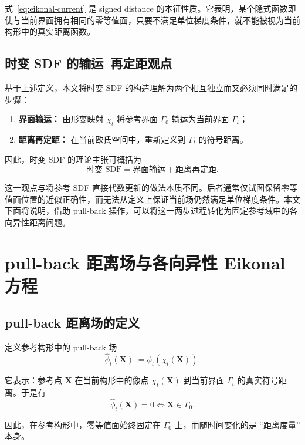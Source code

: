 \documentclass[12pt,a4paper]{ctexart}
\numberwithin{equation}{section}
\newcommand{\bX}{\bm{X}}
\begin{document}
式~\eqref{eq:eikonal-current} 是 signed distance 的本征性质。它表明，某个隐式函数即使与当前界面拥有相同的零等值面，只要不满足单位梯度条件，就不能被视为当前构形中的真实距离函数。

\subsection{时变 SDF 的输运--再定距观点}

基于上述定义，本文将时变 SDF 的构造理解为两个相互独立而又必须同时满足的步骤：
\begin{enumerate}[label=\arabic*)]
    \item \textbf{界面输运：} 由形变映射 $\chi_t$ 将参考界面 $\Gamma_0$ 输运为当前界面 $\Gamma_t$；
    \item \textbf{距离再定距：} 在当前欧氏空间中，重新定义到 $\Gamma_t$ 的符号距离。
\end{enumerate}

因此，时变 SDF 的理论主张可概括为
\begin{equation}
\boxed{
\text{时变 SDF} = \text{界面输运} + \text{距离再定距}.
}
\end{equation}

这一观点与将参考 SDF 直接代数更新的做法本质不同。后者通常仅试图保留零等值面位置的近似正确性，而无法从定义上保证当前场仍然满足单位梯度条件。本文下面将说明，借助 pull-back 操作，可以将这一两步过程转化为固定参考域中的各向异性距离问题。

\section{pull-back 距离场与各向异性 Eikonal 方程}\label{sec:anisotropic-eikonal}

\subsection{pull-back 距离场的定义}

定义参考构形中的 pull-back 场
\begin{equation}
\widehat{\phi}_t(\bX):=\phi_t(\chi_t(\bX)).
\label{eq:pull-back-sdf}
\end{equation}

它表示：参考点 $\bX$ 在当前构形中的像点 $\chi_t(\bX)$ 到当前界面 $\Gamma_t$ 的真实符号距离。于是有
\begin{equation}
\widehat{\phi}_t(\bX)=0 \iff \bX\in\Gamma_0.
\end{equation}

因此，在参考构形中，零等值面始终固定在 $\Gamma_0$ 上，而随时间变化的是 ``距离度量'' 本身。
\end{document}
